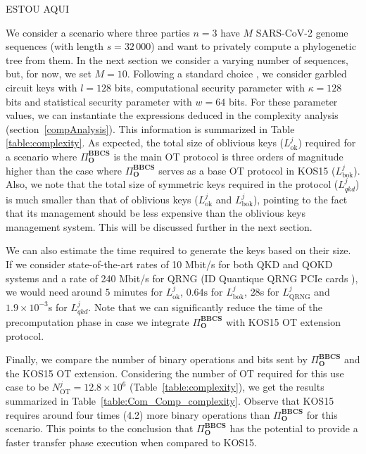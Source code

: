 ESTOU AQUI

We consider a scenario where three parties $n=3$ have $M$ SARS-CoV-2 genome sequences (with length $s=32\,000$) and want to privately compute a phylogenetic tree from them. In the next section we consider a varying number of sequences, but, for now, we set $M=10$. Following a standard choice \cite{ALSZ13}, we consider garbled circuit keys with $l = 128$ bits, computational security parameter with $\kappa = 128$ bits and statistical security parameter with $w = 64$ bits. For these parameter values, we can instantiate the expressions deduced in the complexity analysis (section~\ref{compAnalysis}). This information is summarized in Table~ \ref{table:complexity}. As expected, the total size of oblivious keys ($L^j_{\text{ok}}$) required for a scenario where $\Pi^{\textbf{BBCS}}_{\textbf{O}}$ is the main OT protocol is three orders of magnitude higher than the case where $\Pi^{\textbf{BBCS}}_{\textbf{O}}$ serves as a base OT protocol in KOS15 ($L^j_{\text{bok}}$). Also, we note that the total size of symmetric keys required in the protocol ($L^j_{qkd}$) is much smaller than that of oblivious keys ($L^j_{\text{ok}}$ and $L^j_{\text{bok}}$), pointing to the fact that its management should be less expensive than the oblivious keys management system. This will be discussed further in the next section.

We can also estimate the time required to generate the keys based on their size. If we consider state-of-the-art rates of 10 Mbit/s for both QKD and QOKD systems \cite{YPT18} and a rate of 240 Mbit/s for QRNG (ID Quantique QRNG PCIe cards \cite{IDQ}), we would need around $5\text{ minutes}$ for $L^j_{\text{ok}}$, $0.64\text{s}$ for $L^j_{\text{bok}}$, $28$s for $L^j_{\text{QRNG}}$ and $1.9\times 10^{-3}$s for $L^{j}_{qkd}$. Note that we can significantly reduce the time of the precomputation phase in case we integrate $\Pi^{\textbf{BBCS}}_{\textbf{O}}$ with KOS15 OT extension protocol. 

Finally, we compare the number of binary operations and bits sent by $\Pi^{\textbf{BBCS}}_{\textbf{O}}$ and the KOS15 OT extension. Considering the number of OT required for this use case to be $N^j_{\text{OT}} = 12.8\times 10^6$ (Table~\ref{table:complexity}), we get the results summarized in Table~\ref{table:Com_Comp_complexity}. Observe that KOS15 requires around four times (4.2) more binary operations than $\Pi^{\textbf{BBCS}}_{\textbf{O}}$ for this scenario. This points to the conclusion that $\Pi^{\textbf{BBCS}}_{\textbf{O}}$ has the potential to provide a faster transfer phase execution when compared to KOS15.

